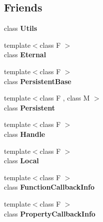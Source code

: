 \subsection*{Friends}
\begin{DoxyCompactItemize}
\item 
\hypertarget{classv8_1_1_local_abc0f7da619e9e72510dc07ed7b5ff6d8}{}class {\bfseries Utils}\label{classv8_1_1_local_abc0f7da619e9e72510dc07ed7b5ff6d8}

\item 
\hypertarget{classv8_1_1_local_adf5d8780aceb9310fb1246aae7ec348e}{}{\footnotesize template$<$class F $>$ }\\class {\bfseries Eternal}\label{classv8_1_1_local_adf5d8780aceb9310fb1246aae7ec348e}

\item 
\hypertarget{classv8_1_1_local_abb172e0bb22fc5fed7a3a66f29d046ce}{}{\footnotesize template$<$class F $>$ }\\class {\bfseries Persistent\+Base}\label{classv8_1_1_local_abb172e0bb22fc5fed7a3a66f29d046ce}

\item 
\hypertarget{classv8_1_1_local_ad845ec8872174be0a9ca9a3dd1898d30}{}{\footnotesize template$<$class F , class M $>$ }\\class {\bfseries Persistent}\label{classv8_1_1_local_ad845ec8872174be0a9ca9a3dd1898d30}

\item 
\hypertarget{classv8_1_1_local_a67ca1a2d91273eaf85fb3d23ba8ce984}{}{\footnotesize template$<$class F $>$ }\\class {\bfseries Handle}\label{classv8_1_1_local_a67ca1a2d91273eaf85fb3d23ba8ce984}

\item 
\hypertarget{classv8_1_1_local_afb872edb4aac7ba55f0da004113aa2b0}{}{\footnotesize template$<$class F $>$ }\\class {\bfseries Local}\label{classv8_1_1_local_afb872edb4aac7ba55f0da004113aa2b0}

\item 
\hypertarget{classv8_1_1_local_a76786e6fa2d0eac5e2d4f647659d0d23}{}{\footnotesize template$<$class F $>$ }\\class {\bfseries Function\+Callback\+Info}\label{classv8_1_1_local_a76786e6fa2d0eac5e2d4f647659d0d23}

\item 
\hypertarget{classv8_1_1_local_a5018adab21fade2b42f4f60e45fa1083}{}{\footnotesize template$<$class F $>$ }\\class {\bfseries Property\+Callback\+Info}\label{classv8_1_1_local_a5018adab21fade2b42f4f60e45fa1083}


\end{DoxyCompactItemize}
